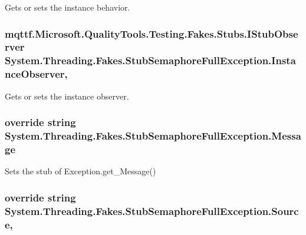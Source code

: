 Gets or sets the instance behavior.

\hypertarget{class_system_1_1_threading_1_1_fakes_1_1_stub_semaphore_full_exception_a96ecd3fc5ea36430682aa41a08d072ab}{
\subsubsection[{Instance\-Observer}]{\setlength{\rightskip}{0pt plus 5cm}mqttf.\-Microsoft.\-Quality\-Tools.\-Testing.\-Fakes.\-Stubs.\-I\-Stub\-Observer System.\-Threading.\-Fakes.\-Stub\-Semaphore\-Full\-Exception.\-Instance\-Observer\hspace{0.3cm}{\ttfamily [get]}, {\ttfamily [set]}}}\label{class_system_1_1_threading_1_1_fakes_1_1_stub_semaphore_full_exception_a96ecd3fc5ea36430682aa41a08d072ab}


Gets or sets the instance observer.

\hypertarget{class_system_1_1_threading_1_1_fakes_1_1_stub_semaphore_full_exception_ad052db53e037ed4fed993a887bb0f79a}{
\subsubsection[{Message}]{\setlength{\rightskip}{0pt plus 5cm}override string System.\-Threading.\-Fakes.\-Stub\-Semaphore\-Full\-Exception.\-Message\hspace{0.3cm}{\ttfamily [get]}}}\label{class_system_1_1_threading_1_1_fakes_1_1_stub_semaphore_full_exception_ad052db53e037ed4fed993a887bb0f79a}


Sets the stub of Exception.\-get\-\_\-\-Message()

\hypertarget{class_system_1_1_threading_1_1_fakes_1_1_stub_semaphore_full_exception_a978ea92420abe7c0dcc7cda2dcbd737e}{
\subsubsection[{Source}]{\setlength{\rightskip}{0pt plus 5cm}override string System.\-Threading.\-Fakes.\-Stub\-Semaphore\-Full\-Exception.\-Source\hspace{0.3cm}{\ttfamily [get]}, {\ttfamily [set]}}}\label{class_system_1_1_threading_1_1_fakes_1_1_stub_semaphore_full_exception_a978ea92420abe7c0dcc7cda2dcbd737e}


